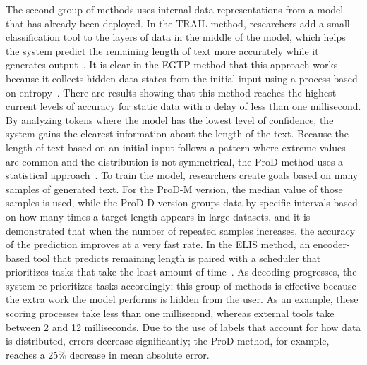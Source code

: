 \documentclass[conference]{IEEEtran}
\begin{document}
The second group of methods uses internal data representations from a model that has already been deployed. In the TRAIL method, researchers add a small classification tool to the layers of data in the middle of the model, which helps the system predict the remaining length of text more accurately while it generates output~\cite{shahout2025trail}. It is clear in the EGTP method that this approach works because it collects hidden data states from the initial input using a process based on entropy~\cite{xie2026egtp}. There are results showing that this method reaches the highest current levels of accuracy for static data with a delay of less than one millisecond. By analyzing tokens where the model has the lowest level of confidence, the system gains the clearest information about the length of the text. Because the length of text based on an initial input follows a pattern where extreme values are common and the distribution is not symmetrical, the ProD method uses a statistical approach~\cite{wang2026prodm}. To train the model, researchers create goals based on many samples of generated text. For the ProD-M version, the median value of those samples is used, while the ProD-D version groups data by specific intervals based on how many times a target length appears in large datasets, and it is demonstrated that when the number of repeated samples increases, the accuracy of the prediction improves at a very fast rate. In the ELIS method, an encoder-based tool that predicts remaining length is paired with a scheduler that prioritizes tasks that take the least amount of time~\cite{choi2025elis}. As decoding progresses, the system re-prioritizes tasks accordingly; this group of methods is effective because the extra work the model performs is hidden from the user. As an example, these scoring processes take less than one millisecond, whereas external tools take between 2 and 12 milliseconds. Due to the use of labels that account for how data is distributed, errors decrease significantly; the ProD method, for example, reaches a 25\% decrease in mean absolute error.
\end{document}
